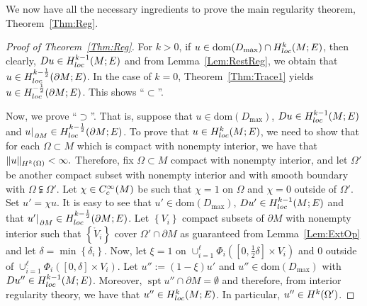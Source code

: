 \documentclass[a4paper,10pt,reqno]{amsart}
\newcommand{\rest}[1]{{{\lvert_{}}_{}}_{#1}}
\newcommand{\dbrac}[1]{\left\{#1\right\}}
\newcommand{\interior}[1]{\mathring{#1}}
\newcommand{\norm}[1]{\| #1 \|}%
\newcommand{\set}[1]{\dbrac{#1}}
\newcommand{\Ck}[2][{}]{{\rm C}^{#2}_{\rm #1}}%
\newcommand{\Hard}[2][{}]{{\rm H}^{#2}_{\rm #1}}%
\newcommand{\SobH}[2][{}]{\Hard[#1]{\rm #2}}
\newcommand{\dom}{\mathrm{dom}}
\newcommand{\union}{\cup}
\DeclareMathOperator{\spt}{spt}%
\theoremstyle{definition}
\begin{document}
We now have all the necessary ingredients to prove the main regularity theorem, Theorem~\ref{Thm:Reg}.

\begin{proof}[Proof of Theorem~\ref{Thm:Reg}]
For $k > 0$, if $u \in \dom(D_{\max}) \cap \SobH[loc]{k}(M;E)$, then clearly, $Du \in \SobH[loc]{k-1}(M;E)$ and from Lemma~\ref{Lem:RestReg}, we obtain that $u \in \SobH[loc]{k-\frac12}(\partial M;E)$. 
In the case of $k = 0$, Theorem~\ref{Thm:Trace1} yields $u \in \SobH[loc]{-\frac12}(\partial M;E)$.
This shows ``$\subset$''.

Now, we prove ``$\supset$''.
That is, suppose that $u \in \dom(D_{\max})$, $Du \in \SobH[loc]{k-1}(M;E)$ and $u\rest{\partial M} \in \SobH[loc]{k-\frac12}(\partial M;E)$.
To prove that $u \in \SobH[loc]{k}(M;E)$, we need to show that for each $\Omega \subset M$ which is compact with nonempty interior, we have that
$\norm{u}_{\SobH{k}(\Omega)}< \infty.$
Therefore, fix $\Omega \subset M$ compact with nonempty interior, and let $\Omega'$ be another compact subset with nonempty interior and with smooth boundary with $\Omega \subsetneqq \Omega'$.
Let $\chi \in \Ck[c]{\infty}(M)$ be such that $\chi = 1$ on $\Omega$ and $\chi = 0$ outside of $\Omega'$.
Set $u' = \chi u$.
It is easy to see that $u' \in \dom(D_{\max})$, $Du' \in \SobH[loc]{k-1}(M;E)$  and that $u' \rest{\partial M} \in \SobH[loc]{k-\frac12}(\partial M;E)$.
Let $\set{V_i}$ compact subsets of $\partial M$ with nonempty interior such that $\set{\interior{V}_i}$ cover $\Omega' \cap \partial M$ as guaranteed from Lemma~\ref{Lem:ExtOp} and let $\delta = \min\set{\delta_i}$.
Now, let $\xi = 1$ on $\union_{i=1}^\ell \Phi_i ([0,\frac12 \delta] \times V_i)$ and $0$ outside of $\union_{i=1}^\ell \Phi_i([0,\delta] \times V_i)$.
Let $u'' := (1 - \xi)u'$ and $u'' \in \dom(D_{\max})$ with $Du'' \in \SobH[loc]{k-1}(M;E)$.
Moreover, $\spt u'' \cap \partial M = \emptyset$ and therefore, from interior regularity theory, we have that $u'' \in \SobH[loc]{k}(M;E)$.
In particular, $u'' \in \SobH{k}(\Omega')$.


\end{proof}
\end{document}
